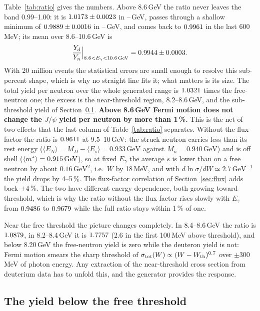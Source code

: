 \documentclass[11pt,a4paper]{article}
\newcommand{\Eg}{E_\gamma}
\newcommand{\jpsi}{J/\psi}
\newcommand{\GeV}{\,\mathrm{GeV}}
\begin{document}
Table~\ref{tab:ratio} gives the numbers.  Above 8.6\,GeV the ratio never leaves the band
0.99--1.00: it is $1.0173\pm0.0023$ in \maxLo--\maxHi\,GeV, passes through a shallow minimum of
$0.9889\pm0.0016$ in \minLo--\minHi\,GeV, and comes back to $0.9961$ in the last 600\,MeV; its mean
over 8.6--10.6\,GeV is
\begin{equation}
\frac{Y_d}{Y_n}\Big|_{8.6<\Eg<10.6\GeV}=\meanHi\pm\meanHiErr .
\end{equation}
With 20 million events the statistical errors are small enough to resolve this sub-percent shape,
which is why no straight line fits it; what matters is its size.
The total yield per neutron over the whole generated range is $1.0321$ times the free-neutron
one; the excess is the near-threshold region, 8.2--8.6\,GeV, and the sub-threshold yield of
Section~\ref{sec:below}.  \textbf{Above 8.6\,GeV Fermi motion does not change the $\jpsi$ yield per
neutron by more than 1\,\%.}  This is the net of two effects that the last column of
Table~\ref{tab:ratio} separates.  Without the flux factor the ratio is $0.9611$ at 9.5--10\,GeV: the
struck neutron carries less than its rest energy ($\langle E_N\rangle=M_D-\langle E_s\rangle=0.933\GeV$
against $M_n=0.940\GeV$) and is off shell ($\langle m^*\rangle=\msAb\GeV$), so at fixed $\Eg$ the
average $s$ is lower than on a free neutron by about $0.16\GeV^2$, i.e.\ $W$ by 18\,MeV, and with
$d\ln\sigma/dW\simeq2.7\GeV^{-1}$ the yield drops by 4--5\,\%.  The flux-factor correlation of
Section~\ref{sec:flux} adds back $+4$\,\%.  The two have different energy dependence, both growing
toward threshold, which is why the ratio without the flux factor rises slowly with $\Eg$ from
$0.9486$ to $0.9679$ while the full ratio stays within 1\,\% of one.

Near the free threshold the picture changes completely.  In 8.4--8.6\,GeV the ratio is $1.0879$, in
8.2--8.4\,GeV it is $1.7757$ (2.6 in the first 100\,MeV above threshold), and below 8.20\,GeV the free-neutron yield is zero while the deuteron
yield is not: Fermi motion smears the sharp threshold of $\sigma_{\rm tot}(W)\propto(W-W_{\rm th})^{0.7}$
over $\pm300$\,MeV of photon energy.  Any extraction of the near-threshold cross section from
deuterium data has to unfold this, and the generator provides the response.

\subsection{The yield below the free threshold}
\label{sec:below}
\end{document}
